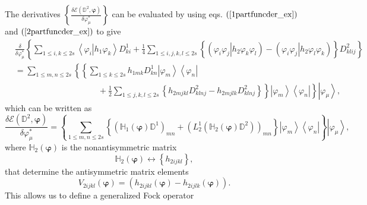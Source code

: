 \documentclass[titlepage]{article}%
\begin{document}
The derivatives $\left\{  \frac{\delta\mathcal{E}\left(  \mathbb{D}%
^{2},\bm{\varphi}\right)  }{\delta\varphi_{\mu}^{\ast}}\right\}  $ can be
evaluated by using eqs. $\left(  \ref{1partfuncder_ex}\right)  $ and $\left(
\ref{2partfuncder_ex}\right)  $ to give
\begin{align}
&  \frac{\delta}{\delta\varphi_{\mu}^{\ast}}\left\{  \sum_{1\leq i,k\leq
2s}\left\langle \left.  \varphi_{i}\right\vert h_{1}\varphi_{k}\right\rangle
D_{ki}^{1}+\frac{1}{4}\sum_{1\leq i,j,k,l\leq2s}\left\{  \left(  \left.
\varphi_{i}\varphi_{j}\right\vert h_{2}\varphi_{k}\varphi_{l}\right)  -\left(
\left.  \varphi_{i}\varphi_{j}\right\vert h_{2}\varphi_{l}\varphi_{k}\right)
\right\}  D_{klij}^{2}\right\} \nonumber\\
&  =\sum_{1\leq m,n\leq2s}\left\{  \left\{  \sum_{1\leq k\leq2s}h_{1mk}%
D_{kn}^{1}\left\vert \varphi_{m}\right\rangle \left\langle \varphi
_{n}\right\vert \right.  \right. \nonumber\\
&  \qquad\qquad\qquad\qquad\qquad+\left.  \left.  \frac{1}{2}\sum_{1\leq
j,k,l\leq2s}\left\{  h_{2mjkl}D_{klnj}^{2}-h_{2mjlk}D_{klnj}^{2}\right\}
\right\}  \left\vert \varphi_{m}\right\rangle \left\langle \varphi
_{n}\right\vert \right\}  \left\vert \varphi_{\mu}\right\rangle ,
\end{align}
which can be written as
\begin{equation}
\frac{\delta\mathcal{E}\left(  \mathbb{D}^{2},\bm{\varphi}\right)  }%
{\delta\varphi_{\mu}^{\ast}}=\left\{  \sum_{1\leq m,n\leq2s}\left\{  \left(
\mathbb{H}_{1}\left(  \bm{\varphi}\right)  \mathbb{D}^{1}\right)
_{mn}+\left(  L_{2}^{1}\left(  \mathbb{H}_{2}\left(  \bm{\varphi}\right)
\mathbb{D}^{2}\right)  \right)  _{mn}\right\}  \left\vert \varphi
_{m}\right\rangle \left\langle \varphi_{n}\right\vert \right\}  \left\vert
\varphi_{\mu}\right\rangle ,
\end{equation}
where $\mathbb{H}_{2}\left(  \bm{\varphi}\right)  $ is the nonantisymmetric
matrix
\begin{equation}
\mathbb{H}_{2}\left(  \bm{\varphi}\right)  \leftrightarrow\left\{
h_{2ijkl}\right\}  ,
\end{equation}
that determine the antisymmetric matrix elements
\begin{equation}
V_{2ijkl}\left(  \bm{\varphi}\right)  =\left(  h_{2ijkl}\left(
\bm{\varphi}\right)  -h_{2ijlk}\left(  \bm{\varphi}\right)  \right)  .
\end{equation}
This allows us to define a generalized Fock operator
\end{document}
